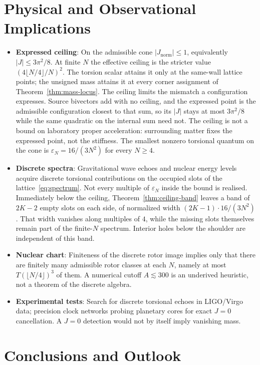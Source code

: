 \documentclass[a4paper]{article}
\theoremstyle{definition}
\newcommand{\Jnorm}{J_{\mathrm{norm}}}
\begin{document}
\section{Physical and Observational Implications}
\label{sec:implications}

\begin{itemize}
  \item \textbf{Expressed ceiling}: On the admissible cone $|\Jnorm|\le 1$, equivalently $|J|\le 3\pi^2/8$. At finite $N$ the effective ceiling is the stricter value $(4\lfloor N/4\rfloor/N)^2$. The torsion scalar attains it only at the same-wall lattice points; the unsigned mass attains it at every corner assignment of Theorem~\ref{thm:mass-locus}. The ceiling limits the mismatch a configuration expresses. Source bivectors add with no ceiling, and the expressed point is the admissible configuration closest to that sum, so its $|J|$ stays at most $3\pi^2/8$ while the same quadratic on the internal sum need not. The ceiling is not a bound on laboratory proper acceleration: surrounding matter fixes the expressed point, not the stiffness. The smallest nonzero torsional quantum on the cone is $\varepsilon_N=16/(3N^2)$ for every $N\geq 4$.
  \item \textbf{Discrete spectra}: Gravitational wave echoes and nuclear energy levels acquire discrete torsional contributions on the occupied slots of the lattice~\eqref{eq:spectrum}. Not every multiple of $\varepsilon_N$ inside the bound is realised. Immediately below the ceiling, Theorem~\ref{thm:ceiling-band} leaves a band of $2K-2$ empty slots on each side, of normalized width $(2K-1)\cdot 16/(3N^2)$. That width vanishes along multiples of $4$, while the missing slots themselves remain part of the finite-$N$ spectrum. Interior holes below the shoulder are independent of this band.
  \item \textbf{Nuclear chart}: Finiteness of the discrete rotor image implies only that there are finitely many admissible rotor classes at each $N$, namely at most $T(\lfloor N/4\rfloor)^3$ of them. A numerical cutoff $A\lesssim 300$ is an underived heuristic, not a theorem of the discrete algebra.
  \item \textbf{Experimental tests}: Search for discrete torsional echoes in LIGO/Virgo data; precision clock networks probing planetary cores for exact $J=0$ cancellation. A $J=0$ detection would not by itself imply vanishing mass.
\end{itemize}

\section{Conclusions and Outlook}
\label{sec:conclusions}
\end{document}
